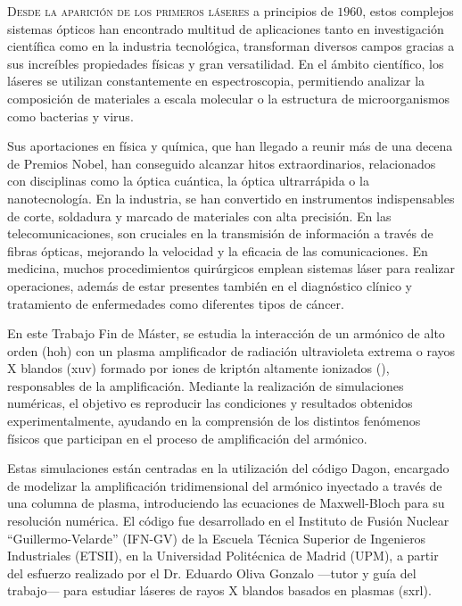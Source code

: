 \lettrine{D}{esde la aparición de los primeros láseres} a principios de $1960$, estos complejos sistemas ópticos han encontrado multitud de aplicaciones tanto en investigación científica como en la industria tecnológica, transforman diversos campos gracias a sus increíbles propiedades físicas y gran versatilidad. En el ámbito científico, los láseres se utilizan constantemente en espectroscopia, permitiendo analizar la composición de materiales a escala molecular o la estructura de microorganismos como bacterias y virus. 

Sus aportaciones en física y química, que han llegado a reunir más de una decena de Premios Nobel, han conseguido alcanzar hitos extraordinarios, relacionados con disciplinas como la óptica cuántica, la óptica ultrarrápida o la nanotecnología. En la industria, se han convertido en instrumentos indispensables de corte, soldadura y marcado de materiales con alta precisión. En las telecomunicaciones, son cruciales en la transmisión de información a través de fibras ópticas, mejorando la velocidad y la eficacia de las comunicaciones. En medicina, muchos procedimientos quirúrgicos emplean sistemas láser para realizar operaciones, además de estar presentes también en el diagnóstico clínico y tratamiento de enfermedades como diferentes tipos de cáncer.

En este Trabajo Fin de Máster, se estudia la interacción de un armónico de alto orden (\acrshort{hoh}) con un plasma amplificador de radiación ultravioleta extrema o rayos X blandos (\acrshort{xuv}) formado por iones de kriptón altamente ionizados (), responsables de la amplificación. Mediante la realización de simulaciones numéricas, el objetivo es reproducir las condiciones y resultados obtenidos experimentalmente, ayudando en la comprensión de los distintos fenómenos físicos que participan en el proceso de amplificación del armónico.

Estas simulaciones están centradas en la utilización del código Dagon\autocite{Oliva2017}, encargado de modelizar la amplificación tridimensional del armónico inyectado a través de una columna de plasma, introduciendo las ecuaciones de Maxwell-Bloch para su resolución numérica. El código fue desarrollado en el Instituto de Fusión Nuclear \enquote{Guillermo-Velarde} (IFN-GV) de la Escuela Técnica Superior de Ingenieros Industriales (ETSII), en la Universidad Politécnica de Madrid (UPM), a partir del esfuerzo realizado por el Dr. Eduardo Oliva Gonzalo ---tutor y guía del trabajo--- para estudiar láseres de rayos X blandos basados en plasmas (\acrshort{sxrl}).

